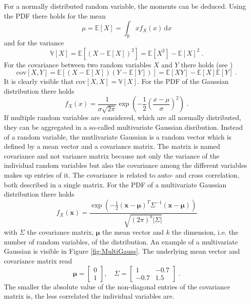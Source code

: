 \documentclass[%
  a4paper,oneside,%
  11pt,%
  smallchapters,
  style=printdev,
  extramargin,
  green,%
  rgb, <cmyk>
  ]{tubsbook}
\begin{document}
For a normally distributed random variable, the moments can be deduced. Using the PDF there holds for the mean
\begin{equation}
\mu = \mathbb{E}[X] = \int_{\mathbb{R}} x f_X(x) \, \mathrm{d}x
\end{equation}
%
and for the variance
\begin{equation}
\mathbb{V}[X] = \mathbb{E}[(X-\mathbb{E}[X])^2] = \mathbb{E}[X^2] - \mathbb{E}[X]^2 \;.
\end{equation}
%
For the covariance between two random variables $X$ and $Y$ there holds (see \cite[p. 1434]{arens2015})
\begin{equation}
\mathrm{cov}[X,Y] = \mathbb{E}[(X-\mathbb{E}[X])(Y-\mathbb{E}[Y])] = \mathbb{E}[XY] - \mathbb{E}[X] \mathbb{E}[Y]\;.
\label{eqn:Covariance}
\end{equation}
It is clearly visible that $\mathrm{cov}[X,X] = \mathbb{V}[X]$.
%
For the PDF of the Gaussian distribution there holds
\begin{equation}
f_X(x) = \frac{1}{\sigma \sqrt{2 \pi}} \exp(-\frac{1}{2} \left(\frac{x-\mu}{\sigma}\right)^2) \;.
\label{eqn:GaussianPDF}
\end{equation}
%
If multiple random variables are considered, which are all normally distributed, they can be aggregated in a so-called multivariate Gaussian disribution. Instead of a random variable, the mutlivariate Gaussian is a random vector which is defined by a mean vector and a covariance matrix. The matrix is named covariance and not variance matrix because not only the variance of the individual random variables but also the covariance among the different variables makes up entries of it. The covariance is related to auto- and cross correlation, both described in a single matrix.
For the PDF of a multivariate Gaussian distribution there holds
\begin{equation}
f_X(\bm{x}) = \frac{\exp(-\frac{1}{2}(\bm{x}-\bm{\mu})^T \Sigma^{-1}(\bm{x}-\bm{\mu}))}{\sqrt{(2\pi)^k \lvert \Sigma \rvert}}
\label{eqn:MultivariateGaussian}
\end{equation}
with $\Sigma$ the covariance matrix, $\bm{\mu}$ the mean vector and $k$ the dimension, i.e. the number of random variables, of the distribution.
An example of a multivariate Gaussian is visible in Figure \ref{fig:MultiGauss}. The underlying mean vector and covariance matrix read
\begin{equation}
\bm{\mu} = \begin{bmatrix}
           0 \\
           1
         \end{bmatrix}
, \quad     
\Sigma = \begin{bmatrix}
1 & -0.7 \\
-0.7 & 1.5 
\end{bmatrix} \;.
\end{equation}
The smaller the absolute value of the non-diagonal entries of the covariance matrix is, the less correlated the individual variables are.
\end{document}

